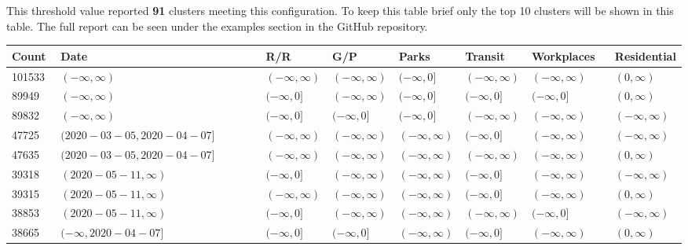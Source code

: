 \documentclass{article}
\begin{document}
This threshold value reported \textbf{91} clusters meeting this configuration.  To keep this table brief only the top 10 clusters will be shown in this table.  The full report can be seen under the examples section in the GitHub repository.
\newline
\begin{adjustbox}{width=\textwidth,totalheight=\textheight,keepaspectratio,rotate=0,caption={Demo Configuration 1 - Results},nofloat=table}
\begin{tabular}{ |p{0.08\linewidth}|p{0.38\linewidth}|p{0.1\linewidth}|p{0.1\linewidth}|p{0.1\linewidth}|p{0.1\linewidth}|p{0.15\linewidth}|p{0.15\linewidth}| }
\hline
Count&Date&R/R&G/P&Parks&Transit&Workplaces&Residential \\
\hline
101533&\((-\infty,\infty)\)&\((-\infty,\infty)\)&\((-\infty,\infty)\)&\((-\infty,0]\)&\((-\infty,\infty)\)&\((-\infty,\infty)\)&\((0,\infty)\) \\
\hline
89949&\((-\infty,\infty)\)&\((-\infty,0]\)&\((-\infty,\infty)\)&\((-\infty,0]\)&\((-\infty,0]\)&\((-\infty,0]\)&\((0,\infty)\) \\
\hline
89832&\((-\infty,\infty)\)&\((-\infty,0]\)&\((-\infty,0]\)&\((-\infty,0]\)&\((-\infty,\infty)\)&\((-\infty,\infty)\)&\((-\infty,\infty)\) \\
\hline
47725&\((2020-03-05,2020-04-07]\)&\((-\infty,\infty)\)&\((-\infty,\infty)\)&\((-\infty,\infty)\)&\((-\infty,0]\)&\((-\infty,\infty)\)&\((-\infty,\infty)\) \\
\hline
47635&\((2020-03-05,2020-04-07]\)&\((-\infty,\infty)\)&\((-\infty,\infty)\)&\((-\infty,\infty)\)&\((-\infty,\infty)\)&\((-\infty,\infty)\)&\((0,\infty)\) \\
\hline
39318&\((2020-05-11,\infty)\)&\((-\infty,0]\)&\((-\infty,\infty)\)&\((-\infty,\infty)\)&\((-\infty,0]\)&\((-\infty,\infty)\)&\((-\infty,\infty)\) \\
\hline
39315&\((2020-05-11,\infty)\)&\((-\infty,\infty)\)&\((-\infty,\infty)\)&\((-\infty,\infty)\)&\((-\infty,0]\)&\((-\infty,\infty)\)&\((0,\infty)\) \\
\hline
38853&\((2020-05-11,\infty)\)&\((-\infty,0]\)&\((-\infty,\infty)\)&\((-\infty,\infty)\)&\((-\infty,\infty)\)&\((-\infty,0]\)&\((-\infty,\infty)\) \\
\hline
38665&\((-\infty,2020-04-07]\)&\((-\infty,0]\)&\((-\infty,0]\)&\((-\infty,\infty)\)&\((-\infty,0]\)&\((-\infty,\infty)\)&\((0,\infty)\) \\
\hline
\end{tabular}
\end{adjustbox}
\end{document}
